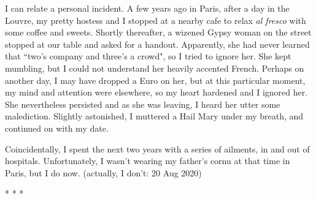 I can relate a personal incident. A few years ago in Paris, after a day in the Louvre, my pretty hostess and I stopped at a nearby cafe to relax \emph{al fresco} with some coffee and sweets. Shortly thereafter, a wizened Gypsy woman on the street stopped at our table and asked for a handout. Apparently, she had never learned that ``two's company and three's a crowd", so I tried to ignore her. She kept mumbling, but I could not understand her heavily accented French. Perhaps on another day, I may have dropped a Euro on her, but at this particular moment, my mind and attention were elsewhere, so my heart hardened and I ignored her. She nevertheless persisted and as she was leaving, I heard her utter some malediction. Slightly astonished, I muttered a Hail Mary under my breath, and continued on with my date.

Coincidentally, I spent the next two years with a series of ailments, in and out of hospitals. Unfortunately, I wasn't wearing my father's cornu at that time in Paris, but I do now. (actually, I don't: 20 Aug 2020)




\begin{center}* * *\end{center}

